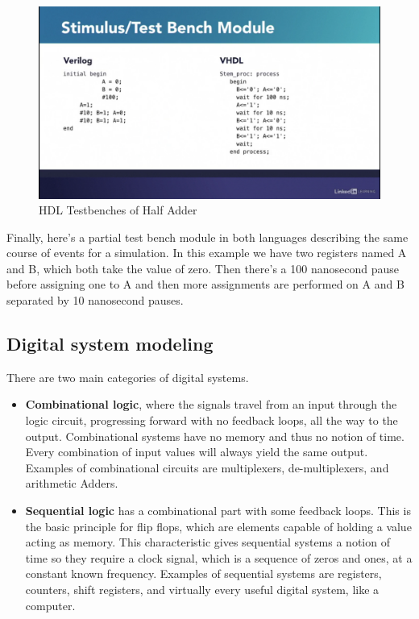 \begin{figure}[H]
	\begin{center}
		\includegraphics[width=5in]{images/HDLTB.png}
		\caption{HDL Testbenches of Half Adder}
		\label{HDLTB}
	\end{center}
\end{figure}

Finally, here's a partial test bench module in both languages describing the same course of events for a simulation. In this example we have two registers named A and B, which both take the value of zero. Then there's a 100 nanosecond pause before assigning one to A and then more assignments are performed on A and B separated by 10 nanosecond pauses. 

\subsection{Digital system modeling}
There are two main categories of digital systems. 
\begin{itemize}
	\item \textbf{Combinational logic}, where the signals travel from an input through the logic circuit, progressing forward with no feedback loops, all the way to the output. Combinational systems have no memory and thus no notion of time. Every combination of input values will always yield the same output. Examples of combinational circuits are multiplexers, de-multiplexers, and arithmetic Adders.
	\item \textbf{Sequential logic} has a combinational part with some feedback loops. This is the basic principle for flip flops, which are elements capable of holding a value acting as memory. This characteristic gives sequential systems a notion of time so they require a clock signal, which is a sequence of zeros and ones, at a constant known frequency. Examples of sequential systems are registers, counters, shift registers, and virtually every useful digital system, like a computer. 
\end{itemize}	

